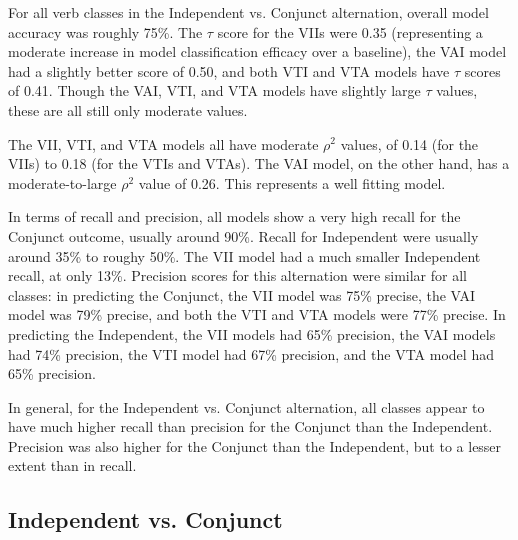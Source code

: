 For all verb classes in the Independent vs. Conjunct alternation, overall model accuracy was roughly 75\%. The $\tau$ score for the VIIs were 0.35 (representing a moderate increase in model classification efficacy over a baseline), the VAI model had a slightly better score of 0.50, and both VTI and VTA models have $\tau$ scores of 0.41. Though the VAI, VTI, and VTA models have slightly large $\tau$ values, these are all still only  moderate values.

The VII, VTI, and VTA models all have moderate $\rho^{2}$ values, of 0.14 (for the VIIs) to 0.18 (for the VTIs and VTAs). The VAI model, on the other hand, has a moderate-to-large $\rho^{2}$ value of 0.26. This represents a well fitting model. 

In terms of recall and precision, all models show a very high recall for the Conjunct outcome, usually around 90\%. Recall for Independent were usually around 35\% to roughy 50\%. The VII model had a much smaller Independent recall, at only 13\%. Precision scores for this alternation were similar for all classes: in predicting the Conjunct, the VII model was 75\% precise, the VAI model was 79\% precise, and both the VTI and VTA models were 77\% precise. In predicting the Independent, the VII models had 65\% precision, the VAI models had 74\% precision, the VTI model had 67\% precision, and the VTA model had 65\% precision. 

In general, for the Independent vs. Conjunct alternation, all classes appear to have much higher recall than precision for the Conjunct than the Independent. Precision was also higher for the Conjunct than the Independent, but to a lesser extent than in recall.  

\subsection{Independent vs. Conjunct}


